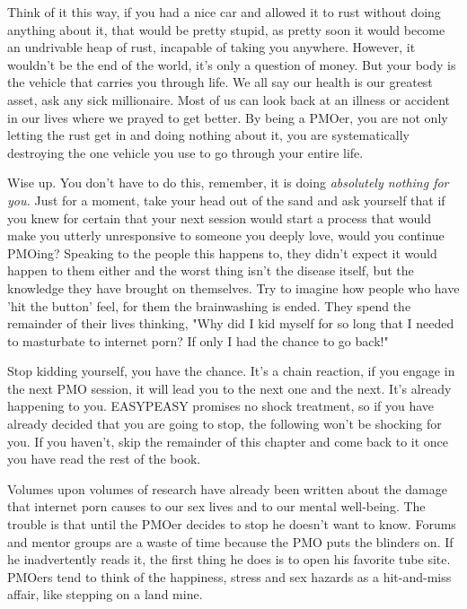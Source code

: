 Think of it this way, if you had a nice car and allowed it to rust without doing anything about it, that would be pretty stupid, as pretty soon it would become an undrivable heap of rust, incapable of taking you anywhere. However, it wouldn't be the end of the world, it's only a question of money. But your body is the vehicle that carries you through life. We all say our health is our greatest asset, ask any sick millionaire. Most of us can look back at an illness or accident in our lives where we prayed to get better. By being a PMOer, you are not only letting the rust get in and doing nothing about it, you are systematically destroying the one vehicle you use to go through your entire life.

Wise up. You don't have to do this, remember, it is doing \textit{absolutely nothing for you.} Just for a moment, take your head out of the sand and ask yourself that if you knew for certain that your next session would start a process that would make you utterly unresponsive to someone you deeply love, would you continue PMOing? Speaking to the people this happens to, they didn't expect it would happen to them either and the worst thing isn't the disease itself, but the knowledge they have brought on themselves. Try to imagine how people who have 'hit the button' feel, for them the brainwashing is ended. They spend the remainder of their lives thinking, "Why did I kid myself for so long that I needed to masturbate to internet porn? If only I had the chance to go back!"

Stop kidding yourself, you have the chance. It's a chain reaction, if you engage in the next PMO session, it will lead you to the next one and the next. It's already happening to you. EASYPEASY promises no shock treatment, so if you have already decided that you are going to stop, the following won't be shocking for you. If you haven't, skip the remainder of this chapter and come back to it once you have read the rest of the book.

Volumes upon volumes of research have already been written about the damage that internet porn causes to our sex lives and to our mental well-being. The trouble is that until the PMOer decides to stop he doesn't want to know. Forums and mentor groups are a waste of time because the PMO puts the blinders on. If he inadvertently reads it, the first thing he does is to open his favorite tube site. PMOers tend to think of the happiness, stress and sex hazards as a hit-and-miss affair, like stepping on a land mine.

